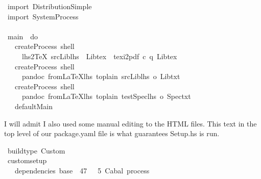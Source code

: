 \documentclass{article}
\begin{document}
\begin{tabbing}\ttfamily
~import~DistributionSimple\\
\ttfamily ~import~SystemProcess\\
\ttfamily ~\\
\ttfamily ~main~~do\\
\ttfamily ~~~createProcess~shell\\
\ttfamily ~~~~~lhs2TeX~srcLiblhs~~Libtex~~texi2pdf~c~q~Libtex\\
\ttfamily ~~~createProcess~shell\\
\ttfamily ~~~~~pandoc~fromLaTeXlhs~toplain~srcLiblhs~o~Libtxt\\
\ttfamily ~~~createProcess~shell\\
\ttfamily ~~~~~pandoc~fromLaTeXlhs~toplain~testSpeclhs~o~Spectxt\\
\ttfamily ~~~defaultMain
\end{tabbing}

I will admit I also used some manual editing to the HTML files.
This text in the top level of our package.yaml file is what guarantees Setup.hs is run.

\begin{tabbing}\ttfamily
~buildtype~Custom\\
\ttfamily ~customsetup\\
\ttfamily ~~~dependencies~base~~47~~~5~Cabal~process
\end{tabbing}
\end{document}
